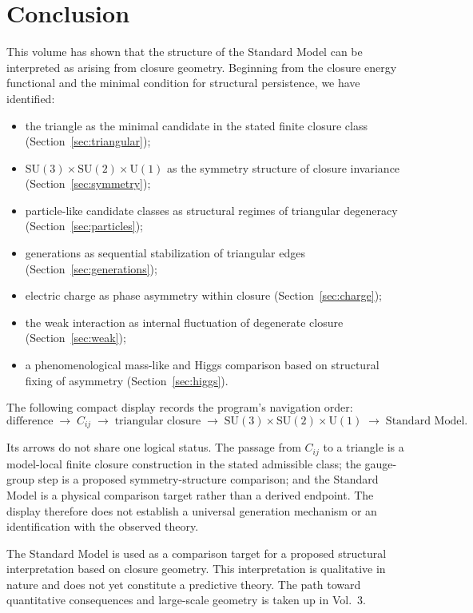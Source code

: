\section{Conclusion}
\label{sec:conclusion}

This volume has shown that the structure of the Standard Model
can be interpreted as arising from closure geometry.
Beginning from the closure energy functional and the minimal condition
for structural persistence, we have identified:

\begin{itemize}
  \item the triangle as the minimal candidate in the stated finite closure class
        (Section~\ref{sec:triangular});
  \item $\mathrm{SU}(3)\times\mathrm{SU}(2)\times\mathrm{U}(1)$
        as the symmetry structure of closure invariance
        (Section~\ref{sec:symmetry});
  \item particle-like candidate classes as structural regimes of triangular degeneracy
        (Section~\ref{sec:particles});
  \item generations as sequential stabilization of triangular edges
        (Section~\ref{sec:generations});
  \item electric charge as phase asymmetry within closure
        (Section~\ref{sec:charge});
  \item the weak interaction as internal fluctuation of degenerate closure
        (Section~\ref{sec:weak});
  \item a phenomenological mass-like and Higgs comparison based on structural
        fixing of asymmetry
        (Section~\ref{sec:higgs}).
\end{itemize}

The following compact display records the program's navigation order:
\begin{equation}
  \text{difference}
  \;\to\; C_{ij}
  \;\to\; \text{triangular closure}
  \;\to\; \mathrm{SU}(3)\times\mathrm{SU}(2)\times\mathrm{U}(1)
  \;\to\; \text{Standard Model.}
\end{equation}

Its arrows do not share one logical status.  The passage from $C_{ij}$ to a
triangle is a model-local finite closure construction in the stated admissible
class; the gauge-group step is a proposed symmetry-structure comparison; and
the Standard Model is a physical comparison target rather than a derived
endpoint.  The display therefore does not establish a universal generation
mechanism or an identification with the observed theory.

The Standard Model is used as a comparison target for a proposed structural
interpretation based on closure geometry.
This interpretation is qualitative in nature
and does not yet constitute a predictive theory.
The path toward quantitative consequences and large-scale geometry
is taken up in Vol.~3.
